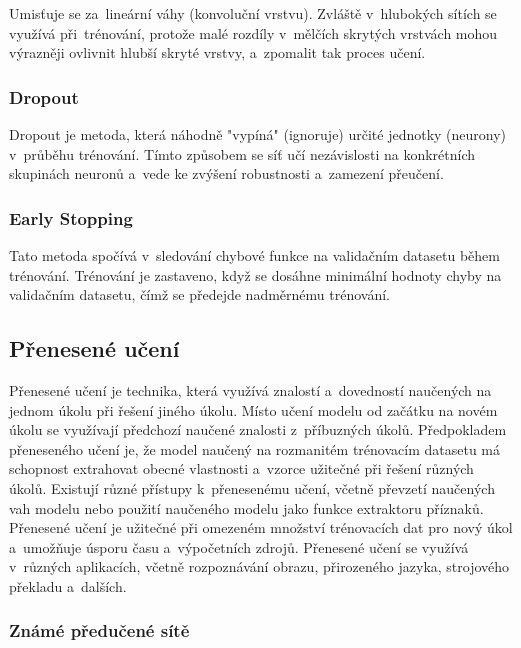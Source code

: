 Umisťuje se za~lineární váhy (konvoluční vrstvu).
Zvláště v~hlubokých sítích se využívá při~trénování, protože malé rozdíly v~mělčích skrytých vrstvách mohou výrazněji ovlivnit hlubší skryté vrstvy, a~zpomalit tak proces učení.

\subsubsection{Dropout}

Dropout je metoda, která náhodně "vypíná" (ignoruje) určité jednotky (neurony) v~průběhu trénování. Tímto způsobem se síť učí nezávislosti na konkrétních skupinách neuronů a~vede ke zvýšení robustnosti a~zamezení přeučení.

\subsubsection{Early Stopping}

Tato metoda spočívá v~sledování chybové funkce na validačním datasetu během trénování. Trénování je zastaveno, když se dosáhne minimální hodnoty chyby na validačním datasetu, čímž se předejde nadměrnému trénování.

\subsection{Přenesené učení}

Přenesené učení je technika, která využívá znalostí a~dovedností naučených na jednom úkolu při řešení jiného úkolu. Místo učení modelu od začátku na novém úkolu se využívají předchozí naučené znalosti z~příbuzných úkolů. Předpokladem přeneseného učení je, že model naučený na rozmanitém trénovacím datasetu má schopnost extrahovat obecné vlastnosti a~vzorce užitečné při řešení různých úkolů. Existují různé přístupy k~přenesenému učení, včetně převzetí naučených vah modelu nebo použití naučeného modelu jako funkce extraktoru příznaků. Přenesené učení je užitečné při omezeném množství trénovacích dat pro nový úkol a~umožňuje úsporu času a~výpočetních zdrojů. Přenesené učení se využívá v~různých aplikacích, včetně rozpoznávání obrazu, přirozeného jazyka, strojového překladu a~dalších.

\subsubsection{Známé předučené sítě}


